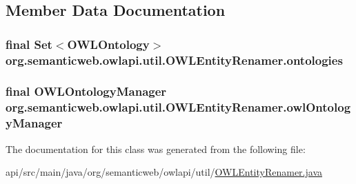 \subsection{Member Data Documentation}
\hypertarget{classorg_1_1semanticweb_1_1owlapi_1_1util_1_1_o_w_l_entity_renamer_abf2e6e75d68be5a087ef1f6a3773e497}{
\subsubsection[{ontologies}]{\setlength{\rightskip}{0pt plus 5cm}final Set$<${\bf O\-W\-L\-Ontology}$>$ org.\-semanticweb.\-owlapi.\-util.\-O\-W\-L\-Entity\-Renamer.\-ontologies\hspace{0.3cm}{\ttfamily [private]}}}\label{classorg_1_1semanticweb_1_1owlapi_1_1util_1_1_o_w_l_entity_renamer_abf2e6e75d68be5a087ef1f6a3773e497}
\hypertarget{classorg_1_1semanticweb_1_1owlapi_1_1util_1_1_o_w_l_entity_renamer_aef52bfe7ef1ea7aed6eb487eb9bd95cb}{
\subsubsection[{owl\-Ontology\-Manager}]{\setlength{\rightskip}{0pt plus 5cm}final {\bf O\-W\-L\-Ontology\-Manager} org.\-semanticweb.\-owlapi.\-util.\-O\-W\-L\-Entity\-Renamer.\-owl\-Ontology\-Manager\hspace{0.3cm}{\ttfamily [private]}}}\label{classorg_1_1semanticweb_1_1owlapi_1_1util_1_1_o_w_l_entity_renamer_aef52bfe7ef1ea7aed6eb487eb9bd95cb}


The documentation for this class was generated from the following file\-:\begin{DoxyCompactItemize}
\item 
api/src/main/java/org/semanticweb/owlapi/util/\hyperlink{_o_w_l_entity_renamer_8java}{O\-W\-L\-Entity\-Renamer.\-java}\end{DoxyCompactItemize}

